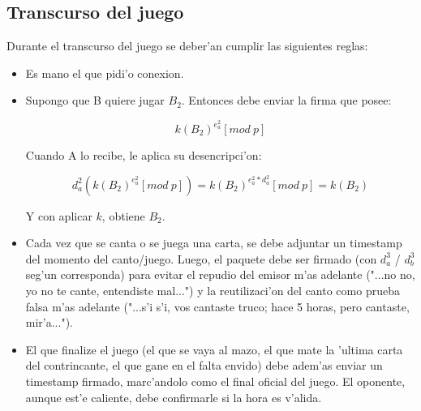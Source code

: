 \subsection{Transcurso del juego}
Durante el transcurso del juego se deber'an cumplir las siguientes reglas:

\begin{itemize}
\item Es mano el que pidi'o conexion.

\item Supongo que B quiere jugar $B_2$. Entonces debe enviar la firma que posee:

$$	k(B_2)^{e^2_a} [mod\ p] $$
	
Cuando A lo recibe, le aplica su desencripci'on:

$$	d^2_a(k(B_2)^{e^2_a} [mod\ p]) = 
	k(B_2)^{e^2_a * d^2_a} [mod\ p] = 
	k(B_2) $$

Y con aplicar $k$, obtiene $B_2$.

\item Cada vez que se canta o se juega una carta, se debe adjuntar un timestamp del momento del canto/juego. Luego, el paquete debe ser firmado (con $d^3_a$ / $d^3_b$ seg'un corresponda) para evitar el repudio del emisor m'as adelante ("...no no, yo no te cante, entendiste mal...") y la reutilizaci'on del canto como prueba falsa m'as adelante ("...s'i s'i, vos cantaste truco; hace 5 horas, pero cantaste, mir'a...").

\item El que finalize el juego (el que se vaya al mazo, el que mate la 'ultima carta del contrincante, el que gane en el falta envido) debe adem'as enviar un timestamp firmado, marc'andolo como el final oficial del juego. El oponente, aunque est'e caliente, debe confirmarle si la hora es v'alida.

\end{itemize}
